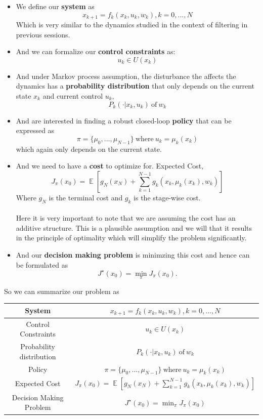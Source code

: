 \documentclass[twoside]{article}
\DeclareMathOperator{\EX}{\mathbb{E}}
\begin{document}
\begin{itemize}
    \item We define our \textbf{system} as $$x_{k+1}= f_k(x_k,u_k,w_k), k=0,...,N$$
    Which is very similar to the dynamics studied in the context of filtering in previous sessions.
    \item And we can formalize our \textbf{control constraints} as:
    $$u_k \in U(x_k)$$
    \item And under Markov process assumption, the disturbance the affects the dynamics has a \textbf{probability distribution} that only depends on the current state $x_k$ and current control $u_k$,
    $$P_k(\cdot|x_k,u_k) \ \text{of} \ w_k$$
    \item And are interested in finding a robust closed-loop \textbf{policy} that can be expressed as  $$\pi=\{\mu_0,...,\mu_{N-1}\} \ \text{where} \ u_k=\mu_k(x_k)$$
    which again only depends on the current state.
    \item And we need to have a \textbf{cost} to optimize for. Expected Cost,
    $$J_\pi(x_0)=\EX[g_N(x_N)+\sum_{k=1}^{N-1} g_k(x_k,\mu_k(x_k),w_k)]$$
    Where $g_N$ is the terminal cost and $g_k$ is the stage-wise cost. \\ \\
    Here it is very important to note that we are assuming the cost has an additive structure. This is a plausible assumption and we will that it results in the principle of optimality which will simplify the problem significantly.

    \item And our \textbf{decision making problem} is minimzing this cost and hence can be formulated as
    $$J^\star(x_0)=\min_{\pi} J_\pi(x_0).$$
\end{itemize}
So we can summarize our problem as 
\begin{center}
    \begin{tabular}{|c|c|}
    \hline
        System &  $x_{k+1}= f_k(x_k,u_k,w_k), k=0,...,N$\\
    \hline
        Control Constraints & $u_k \in U(x_k)$ \\
    \hline
        Probability distribution & $P_k(\cdot|x_k,u_k) \ \text{of} \ w_k$ \\
    \hline
        Policy & $\pi=\{\mu_0,...,\mu_{N-1}\} \ \text{where} \ u_k=\mu_k(x_k)$ \\
    \hline
        Expected Cost & $J_\pi(x_0)=\EX[g_N(x_N)+\sum_{k=1}^{N-1} g_k(x_k,\mu_k(x_k),w_k)]$ \\
    \hline
        Decision Making Problem & $J^\star(x_0)=\min_{\pi} J_\pi(x_0)$ \\
    \hline
    \end{tabular}
\end{center}
   
\end{document}
